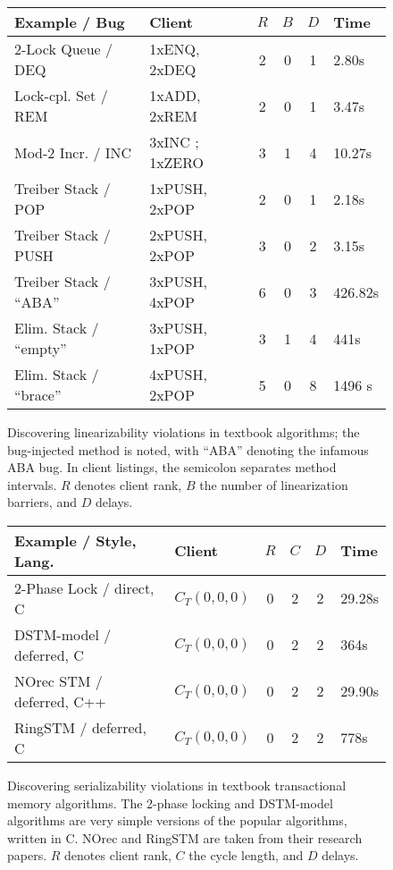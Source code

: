 \begin{figure}[t]
  \centering
    \centering
    \small
    \begin{tabular}{|l|l|ccc|l|}
      \hline
      Example / Bug & Client & $R$ & $B$ & $D$ & Time \\
      \hline
      2-Lock Queue / DEQ 
      & 1xENQ, 2xDEQ
      & 2 & 0 & 1 & 2.80s \\
      Lock-cpl. Set / REM
      & 1xADD, 2xREM
      & 2 & 0 & 1 & 3.47s \\
      Mod-2 Incr. / INC
      & 3xINC ; 1xZERO
      & 3 & 1 & 4 & 10.27s \\
      Treiber Stack / POP 
      & 1xPUSH, 2xPOP
      & 2 & 0 & 1 & 2.18s \\
      Treiber Stack / PUSH
      & 2xPUSH, 2xPOP
      & 3 & 0 & 2 & 3.15s \\ %
      Treiber Stack / ``ABA''
      & 3xPUSH, 4xPOP
      & 6 & 0 & 3 & 426.82s \\
      \hline
      \hline
      Elim. Stack / ``empty''
      & 3xPUSH, 1xPOP
      & 3 & 1 & 4 & 441s \\
      Elim. Stack / ``brace''
      & 4xPUSH, 2xPOP
      & 5 & 0 & 8 & 1496 s \\
      \hline
    \end{tabular}
    \caption{Discovering linearizability violations in textbook algorithms; 
      the bug-injected method is noted, with ``ABA'' denoting the
      infamous ABA bug.  In client listings, the semicolon separates method
      intervals. $R$ denotes client rank, $B$ the number of linearization 
      barriers, and $D$ delays.}
    \label{fig:exps:lin}
  \hfill
  
    \centering
    \small
    \begin{tabular}{|l|l|ccc|l|}
      \hline
      Example / Style, Lang. & Client & $R$ & $C$ & $D$ & Time \\
      \hline
      2-Phase Lock / direct, C
      & $C_T(0,0,0)$
      & 0 & 2 & 2 & 29.28s \\
      DSTM-model / deferred, C
      & $C_T(0,0,0)$
      & 0 & 2 & 2 & 364s \\
      \hline
      \hline
      NOrec STM / deferred, C++
      & $C_T(0,0,0)$
      & 0 & 2 & 2 & 29.90s \\
      RingSTM / deferred, C
      & $C_T(0,0,0)$
      & 0 & 2 & 2 & 778s \\
      \hline
    \end{tabular}
    \caption{Discovering serializability violations in textbook transactional
      memory algorithms.
      The 2-phase locking and DSTM-model algorithms are very simple versions
      of the popular algorithms, written in C.
      NOrec and RingSTM are taken from their research papers.
      $R$ denotes client rank, $C$ the cycle length, and $D$ delays.}
    \label{fig:exps:ser}
\vspace{-5mm}
\end{figure}

